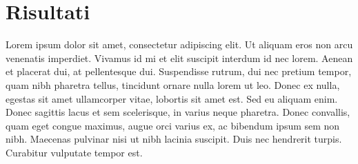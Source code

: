 \chapter{Risultati}
Lorem ipsum dolor sit amet, consectetur adipiscing elit. Ut aliquam eros non arcu venenatis imperdiet. Vivamus id mi et elit suscipit interdum id nec lorem. Aenean et placerat dui, at pellentesque dui. Suspendisse rutrum, dui nec pretium tempor, quam nibh pharetra tellus, tincidunt ornare nulla lorem ut leo. Donec ex nulla, egestas sit amet ullamcorper vitae, lobortis sit amet est. Sed eu aliquam enim. Donec sagittis lacus et sem scelerisque, in varius neque pharetra. Donec convallis, quam eget congue maximus, augue orci varius ex, ac bibendum ipsum sem non nibh. Maecenas pulvinar nisi ut nibh lacinia suscipit. Duis nec hendrerit turpis. Curabitur vulputate tempor est. 